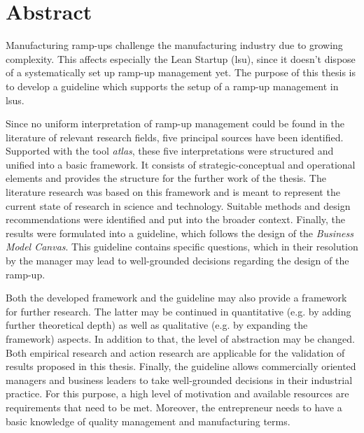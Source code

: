 \chapter*{Abstract}
Manufacturing ramp-ups challenge the manufacturing industry due to growing complexity. This affects especially the Lean Startup (\gls{lsu}), since it doesn't dispose of a systematically set up ramp-up management yet. The purpose of this thesis is to develop a guideline which supports the setup of a ramp-up management in \gls{lsu}s. 

Since no uniform interpretation of ramp-up management could be found in the literature of relevant research fields, five principal sources have been identified.
Supported with the tool \textit{\gls{atlas}}, these five interpretations were structured and unified into a basic framework. It consists of strategic-conceptual and operational elements and provides the structure for the further work of the thesis. The literature research was based on this framework and is meant to represent the current state of research in science and technology. Suitable methods and design recommendations were identified and put into the broader context. Finally, the results were formulated into a guideline, which follows the design of the \textit{Business Model Canvas}. This guideline contains specific questions, which in their resolution by the manager may lead to well-grounded decisions regarding the design of the ramp-up.

Both the developed framework and the guideline may also provide a framework for further research. %
The latter may be continued in quantitative (e.g. by adding further theoretical depth) as well as qualitative (e.g. by expanding the framework) aspects. In addition to that, the level of abstraction may be changed. Both empirical research and action research are applicable for the validation of results proposed in this thesis. 
Finally, the guideline allows commercially oriented managers and business leaders to take well-grounded decisions in their industrial practice. For this purpose, a high level of motivation and available resources are requirements that need to be met. Moreover, the entrepreneur needs to have a basic knowledge of quality management and manufacturing terms. 

